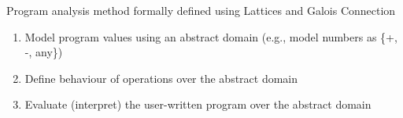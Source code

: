 \Large
Program analysis method formally defined using Lattices and Galois Connection

\begin{enumerate}
    \item Model program values using an abstract domain (e.g., model numbers as \{+, -, any\})
    \item Define behaviour of operations over the abstract domain
    \item Evaluate (interpret) the user-written program over the abstract domain
\end{enumerate}